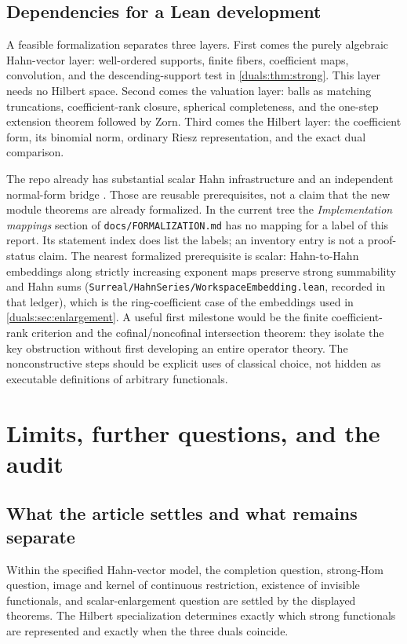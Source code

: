 \documentclass[11pt,letterpaper]{article}
\numberwithin{equation}{section}
\theoremstyle{definition}
\theoremstyle{remark}
\begin{document}
\subsection{Dependencies for a Lean development}
A feasible formalization separates three layers. First comes the
purely algebraic Hahn-vector layer: well-ordered supports, finite fibers,
coefficient maps, convolution, and the descending-support test in
\cref{duals:thm:strong}. This layer needs no Hilbert space. Second comes the
valuation layer: balls as matching truncations, coefficient-rank closure,
spherical completeness, and the one-step extension theorem followed by
Zorn. Third comes the Hilbert layer: the coefficient form, its binomial
norm, ordinary Riesz representation, and the exact dual comparison.

The repo already has substantial scalar Hahn infrastructure and an
independent normal-form bridge \cite{RepoRoot}. Those are reusable
prerequisites, not a claim that the new module theorems are already
formalized. In the current tree the \emph{Implementation mappings}
section of \texttt{docs/FORMALIZATION.md} has no mapping for a label of
this report. Its statement index does list the labels; an inventory
entry is not a proof-status claim. The nearest formalized
prerequisite is scalar: Hahn-to-Hahn embeddings along strictly
increasing exponent maps preserve strong summability and Hahn sums
(\texttt{Surreal/HahnSeries/WorkspaceEmbedding.lean}, recorded in that
ledger), which is the ring-coefficient case of the embeddings used in
\cref{duals:sec:enlargement}. A useful first milestone would be the finite coefficient-rank
criterion and the cofinal/noncofinal intersection theorem: they isolate
the key obstruction without first developing an entire operator theory.
The nonconstructive steps should be explicit uses of classical choice,
not hidden as executable definitions of arbitrary functionals.

\section{Limits, further questions, and the audit}\label{duals:sec:audit}

\subsection{What the article settles and what remains separate}
Within the specified Hahn-vector model, the completion question,
strong-Hom question, image and kernel of continuous restriction,
existence of invisible functionals, and scalar-enlargement question are
settled by the displayed theorems. The Hilbert specialization determines
exactly which strong functionals are represented and exactly when the
three duals coincide.
\end{document}

